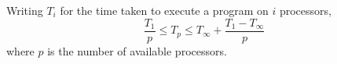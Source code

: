   \begin{theorem}
    Writing $T_{i}$ for the time taken to execute a program on $i$
    processors,
  \[
    \frac{T_{1}}{p} \leq T_{p} \leq T_{\infty} + \frac{T_{1}-T_{\infty}}{p}
  \]
  where $p$ is the number of available processors.


  \end{theorem}


